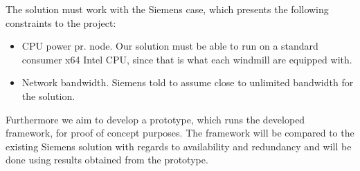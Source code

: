 The solution must work with the Siemens case, which presents the following constraints to the project:
\begin{itemize} 
	\item CPU power pr. node. Our solution must be able to run on a standard consumer x64 Intel CPU, since that is what each windmill are equipped with.
	\item Network bandwidth. Siemens told to assume close to unlimited bandwidth for the solution. 
\end{itemize}

Furthermore we aim to develop a prototype, which runs the developed framework, for proof of concept purposes. The framework will be compared to the existing Siemens solution with regards to availability and redundancy and will be done using results obtained from the prototype. 





%
%
%

